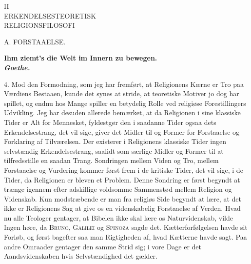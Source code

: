\documentclass[12pt,a4paper,openany]{book}
\newcommand{\opage}[1]{\marginnote{\footnotesize\textit{[#1]}}}
\begin{document}
\opage{13}\begin{center}II\\[6pt]ERKENDELSESTEORETISK\\ RELIGIONSFILOSOFI\end{center}
\clearpage
\opage{14}\mbox{}\clearpage

\opage{15}\begin{center}A. FORSTAAELSE.\end{center}

\begin{flushright}\begin{minipage}{0.55\textwidth}\small\bfseries
Ihm ziemt’s die Welt im Innern zu bewegen.\\
\hfill\textit{Goethe.}
\end{minipage}\end{flushright}

4. Mod den Formodning, som jeg har fremført, at Religionens Kærne er Tro
paa Værdiens Bestaaen, kunde det synes at stride, at teoretiske Motiver
jo dog har spillet, og endnu hos Mange spiller en betydelig Rolle ved
religiøse Forestillingers Udvikling. Jeg har desuden allerede bemærket,
at da Religionen i sine klassiske Tider er Alt for Mennesket, fyldestgør
den i saadanne Tider ogsaa dets Erkendelsestrang, det vil sige, giver
det Midler til og Former for Forstaaelse og Forklaring af Tilværelsen.
Der existerer i Religionens klassiske Tider ingen selvstændig
Erkendelsestrang, saalidt som særlige Midler og Former til at
tilfredsstille en saadan Trang. Sondringen mellem Viden og Tro, mellem
Forstaaelse og Vurdering kommer først frem i de kritiske Tider, det vil
sige, i de Tider, da Religionen er bleven et Problem. Denne Sondring er
først begyndt at trænge igennem efter adskillige voldsomme Sammenstød
mellem Religion og Videnskab. Kun modstræbende er man fra religiøs Side
begyndt at lære, at det ikke er Religionens Sag at give os en
videnskabelig Forstaaelse af Verden. Hvad nu alle Teologer gentager, at
Bibelen ikke skal lære os Naturvidenskab, vilde Ingen høre, da
\textsc{Bruno, Galilei} og \textsc{Spinoza} sagde det.
Kætterforfølgelsen havde sit Forløb, og først bagefter saa man
Rigtigheden af, hvad Kætterne havde sagt. Paa andre Omraader gentager
den samme Strid sig; i vore Dage er det Aandsvidenskaben hvis
Selvstændighed det gælder.
\end{document}
